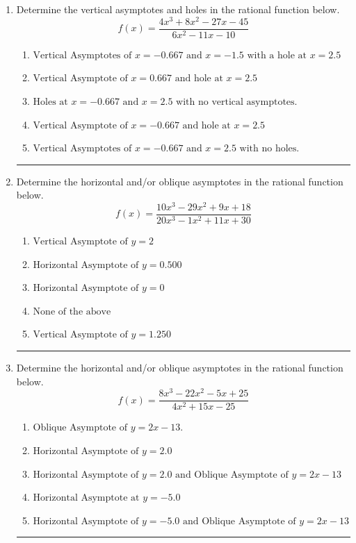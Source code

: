 \documentclass[14pt]{extbook}
\newcommand{\litem}[1]{\item#1\hspace*{-1cm}\rule{\textwidth}{0.4pt}}
\begin{document}
\begin{enumerate}
\litem{
Determine the vertical asymptotes and holes in the rational function below.\[ f(x) = \frac{4x^{3} +8 x^{2} -27 x -45}{6x^{2} -11 x -10} \]\begin{enumerate}[label=\Alph*.]
\item \( \text{Vertical Asymptotes of } x = -0.667 \text{ and } x = -1.5 \text{ with a hole at } x = 2.5 \)
\item \( \text{Vertical Asymptote of } x = 0.667 \text{ and hole at } x = 2.5 \)
\item \( \text{Holes at } x = -0.667 \text{ and } x = 2.5 \text{ with no vertical asymptotes.} \)
\item \( \text{Vertical Asymptote of } x = -0.667 \text{ and hole at } x = 2.5 \)
\item \( \text{Vertical Asymptotes of } x = -0.667 \text{ and } x = 2.5 \text{ with no holes.} \)

\end{enumerate} }
\litem{
Determine the horizontal and/or oblique asymptotes in the rational function below.\[ f(x) = \frac{10x^{3} -29 x^{2} +9 x + 18}{20x^{3} -1 x^{2} +11 x + 30} \]\begin{enumerate}[label=\Alph*.]
\item \( \text{Vertical Asymptote of } y = 2  \)
\item \( \text{Horizontal Asymptote of } y = 0.500  \)
\item \( \text{Horizontal Asymptote of } y = 0  \)
\item \( \text{None of the above} \)
\item \( \text{Vertical Asymptote of } y = 1.250  \)

\end{enumerate} }
\litem{
Determine the horizontal and/or oblique asymptotes in the rational function below.\[ f(x) = \frac{8x^{3} -22 x^{2} -5 x + 25}{4x^{2} +15 x -25} \]\begin{enumerate}[label=\Alph*.]
\item \( \text{Oblique Asymptote of } y = 2x -13. \)
\item \( \text{Horizontal Asymptote of } y = 2.0  \)
\item \( \text{Horizontal Asymptote of } y = 2.0 \text{ and Oblique Asymptote of } y = 2x -13 \)
\item \( \text{Horizontal Asymptote at } y = -5.0 \)
\item \( \text{Horizontal Asymptote of } y = -5.0 \text{ and Oblique Asymptote of } y = 2x -13 \)


\end{enumerate}}
\end{enumerate}
\end{document}
